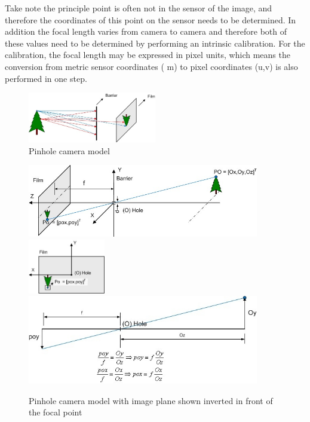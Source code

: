 Take note the principle point is often not in the sensor of the image, and therefore the coordinates of this point on the sensor needs to be determined.  In addition the focal length varies from camera to camera and therefore both of these values need to be determined by performing an intrinsic calibration. For the calibration, the focal length may be expressed in pixel units, which means the conversion from metric sensor coordinates ( m) to pixel coordinates (u,v) is also performed in one step.


\begin{figure}[h!]
  \centering
    \includegraphics[width=0.5\textwidth]{chapters/images/cam_model_fig2}
  \caption{Pinhole camera model}
\end{figure}

\begin{figure}[h!]
  \centering
    \includegraphics[width=0.9\textwidth]{chapters/images/cam_model_fig41} \\
    \includegraphics[width=0.3\textwidth]{chapters/images/cam_model_fig42} \\
    \includegraphics[width=0.9\textwidth]{chapters/images/cam_model_fig43} 
  \caption{Pinhole camera model with image plane shown inverted in front of the focal point}
\end{figure}

